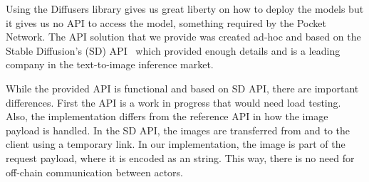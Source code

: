 Using the Diffusers library gives us great liberty on how to deploy the models but it gives us no API to access the model, something required by the Pocket Network. The API solution that we provide was created ad-hoc and based on the Stable Diffusion's (SD) API~\cite{StableDiffusion_API} which provided enough details and is a leading company in the text-to-image inference market.

While the provided API is functional and based on SD API, there are important differences. First the API is a work in progress that would need load testing. Also, the implementation differs from the reference API in how the image payload is handled. In the SD API, the images are transferred from and to the client using a temporary link. In our implementation, the image is part of the request payload, where it is encoded as an string. This way, there is no need for off-chain communication between actors.

